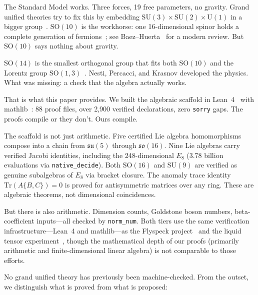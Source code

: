 \documentclass[aps,prd,twocolumn,showpacs,preprintnumbers,superscriptaddress,floatfix]{revtex4-2}
\newcommand{\so}{\mathfrak{so}}
\newcommand{\su}{\mathfrak{su}}
\newcommand{\Tr}{\mathrm{Tr}}
\begin{document}
The Standard Model works. Three forces, 19 free parameters, no gravity.
Grand unified theories try to fix this by embedding
$\mathrm{SU}(3) \times \mathrm{SU}(2) \times \mathrm{U}(1)$ in a bigger
group~\cite{georgi1974,fritzsch1975,georgi1975,weinberg1967,glashow1961,salam1968}.
$\mathrm{SO}(10)$ is the workhorse: one 16-dimensional spinor holds a
complete generation of fermions~\cite{fritzsch1975}; see
Baez--Huerta~\cite{baez2010} for a modern review.  But $\mathrm{SO}(10)$
says nothing about gravity.

$\mathrm{SO}(14)$ is the smallest orthogonal group that fits both $\mathrm{SO}(10)$
and the Lorentz group $\mathrm{SO}(1,3)$~\cite{nesti2007,nesti2010,krasnov2018}.
Nesti, Percacci, and Krasnov developed the physics.
What was missing: a check that the algebra actually works.

That is what this paper provides.  We built the algebraic scaffold in
Lean~4~\cite{demoura2021lean4} with mathlib~\cite{mathlib}: 88 proof files,
over 2,900 verified declarations, zero \texttt{sorry} gaps.
The proofs compile or they don't.  Ours compile.

The scaffold is not just arithmetic.  Five certified Lie algebra
homomorphisms compose into a chain from $\su(5)$ through $\so(16)$.
Nine Lie algebras carry verified Jacobi identities, including the
248-dimensional $E_8$ (3.78 billion evaluations via \texttt{native\_decide}).
Both $\mathrm{SO}(16)$ and $\mathrm{SU}(9)$ are verified as genuine
subalgebras of $E_8$ via bracket closure.
The anomaly trace identity $\Tr(A\{B,C\}) = 0$ is proved for antisymmetric
matrices over any ring.  These are algebraic theorems, not dimensional
coincidences.

But there is also arithmetic.  Dimension counts, Goldstone boson numbers,
beta-coefficient inputs---all checked by \texttt{norm\_num}.
Both tiers use the same verification infrastructure---Lean~4 and
mathlib---as the Flyspeck project~\cite{hales2017formal} and the
liquid tensor experiment~\cite{commelin2022liquid}, though the
mathematical depth of our proofs (primarily arithmetic and
finite-dimensional linear algebra) is not comparable to those efforts.

No grand unified theory has previously been machine-checked.
From the outset, we distinguish what is proved from what is proposed:
\end{document}
